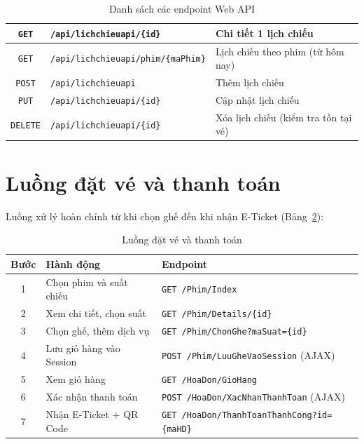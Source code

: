 \documentclass[12pt,a4paper,oneside]{book}
\theoremstyle{plain}
\numberwithin{equation}{chapter}
\begin{document}
\begin{table}[H]
\begin{center}
\begin{tabular}{|c|l|l|}
            \hline
            \texttt{GET}    & \texttt{/api/lichchieuapi/\{id\}}  & Chi tiết 1 lịch chiếu \\
            \hline
            \texttt{GET}    & \texttt{/api/lichchieuapi/phim/\{maPhim\}} & Lịch chiếu theo phim (từ hôm nay) \\
            \hline
            \texttt{POST}   & \texttt{/api/lichchieuapi}         & Thêm lịch chiếu \\
            \hline
            \texttt{PUT}    & \texttt{/api/lichchieuapi/\{id\}}  & Cập nhật lịch chiếu \\
            \hline
            \texttt{DELETE} & \texttt{/api/lichchieuapi/\{id\}}  & Xóa lịch chiếu (kiểm tra tồn tại vé) \\
            \hline
        \end{tabular}
    \end{center}
    \caption{Danh sách các endpoint Web API}\label{table_api}
\end{table}

\section{Luồng đặt vé và thanh toán}\label{Sec4.6}

\noindent Luồng xử lý hoàn chỉnh từ khi chọn ghế đến khi nhận E-Ticket (Bảng~\ref{table_flow}):

\begin{table}[H]
    \begin{center}
        \begin{tabular}{|c|l|l|}
            \hline
            \textbf{Bước} & \textbf{Hành động} & \textbf{Endpoint} \\
            \hline
            1 & Chọn phim và suất chiếu    & \texttt{GET /Phim/Index} \\
            \hline
            2 & Xem chi tiết, chọn suất   & \texttt{GET /Phim/Details/\{id\}} \\
            \hline
            3 & Chọn ghế, thêm dịch vụ    & \texttt{GET /Phim/ChonGhe?maSuat=\{id\}} \\
            \hline
            4 & Lưu giỏ hàng vào Session  & \texttt{POST /Phim/LuuGheVaoSession} (AJAX) \\
            \hline
            5 & Xem giỏ hàng              & \texttt{GET /HoaDon/GioHang} \\
            \hline
            6 & Xác nhận thanh toán       & \texttt{POST /HoaDon/XacNhanThanhToan} (AJAX) \\
            \hline
            7 & Nhận E-Ticket + QR Code   & \texttt{GET /HoaDon/ThanhToanThanhCong?id=\{maHD\}} \\
            \hline
        \end{tabular}
    \end{center}
    \caption{Luồng đặt vé và thanh toán}\label{table_flow}
\end{table}
\end{document}
